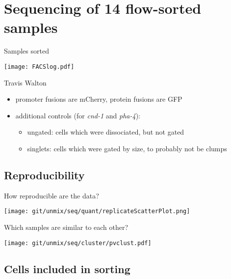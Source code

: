 \documentclass[serif,9pt]{beamer}
\begin{document}
\section{Sequencing of 14 flow-sorted samples}

\begin{frame}{Samples sorted}

\texttt{[image: FACSlog.pdf]}

\hfill Travis Walton

\begin{itemize}

\item promoter fusions are mCherry, protein fusions are GFP

\item additional controls (for {\em cnd-1} and {\em pha-4}):

\begin{itemize}

\item ungated: cells which were dissociated, but not gated

\item singlets: cells which were gated by size, to probably not be clumps

\end{itemize}

\end{itemize}

\end{frame}

\subsection{Reproducibility}

\begin{frame}{How reproducible are the data?}

\texttt{[image: git/unmix/seq/quant/replicateScatterPlot.png]}

\end{frame}

\begin{frame}{Which samples are similar to each other?}

\texttt{[image: git/unmix/seq/cluster/pvclust.pdf]}

\end{frame}

\subsection{Cells included in sorting}
\end{document}
